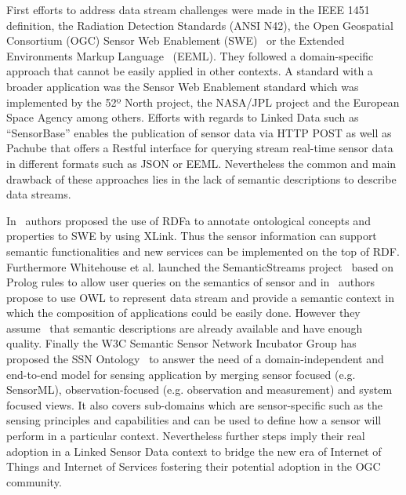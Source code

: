 First efforts to address data stream challenges were made in the IEEE 1451 
definition, the Radiation Detection Standards (ANSI N42), the Open Geospatial Consortium (OGC) Sensor Web 
Enablement (SWE)~\cite{sensorweb-wb} or the Extended Environments Markup Language~\cite{eeml} (EEML). 
They followed a domain-specific approach that cannot be easily applied in other 
contexts. A standard with a broader application was the Sensor Web Enablement 
standard which was implemented by the 52º North project, the NASA/JPL project and the European Space Agency among others. 
Efforts with regards to Linked Data such as ``SensorBase'' enables the publication 
of sensor data via HTTP POST as well as Pachube that offers a Restful interface 
for querying stream real-time sensor data in different formats such as JSON or EEML. Nevertheless the common and 
main drawback of these approaches lies in the lack of semantic descriptions to describe data streams.


In~\cite{Sheth:2008:SSW:1444383.1444435} authors proposed the use of RDFa to annotate ontological concepts and 
properties to SWE by using XLink. Thus the sensor information can support 
semantic functionalities and new services can be implemented on the top of RDF. 
Furthermore Whitehouse et al. launched the SemanticStreams project~\cite{Whitehouse:2006:SSF:2180141.2180148} based on 
Prolog rules to allow user queries on the semantics of sensor and in~\cite{Bouillet:2007:SMU:1769087.1769099} 
authors propose to use OWL to represent data stream and provide a semantic 
context in which the composition of applications could be easily done. However 
they assume~\cite{deri2010} that semantic descriptions are already available and have 
enough quality. Finally the W3C Semantic Sensor Network Incubator Group has 
proposed the SSN Ontology~\cite{Compton:2012:OPS:2400766.2401456} to answer the need of a domain-independent and 
end-to-end model for sensing application by merging sensor focused (e.g. SensorML), observation-focused (e.g. observation and measurement) and system 
focused views. It also covers sub-domains which are sensor-specific such as the 
sensing principles and capabilities and can be used to define how a sensor will 
perform in a particular context. Nevertheless further steps imply their real 
adoption in a Linked Sensor Data context to bridge the new era of Internet of 
Things and Internet of Services fostering their potential adoption in the OGC community.

